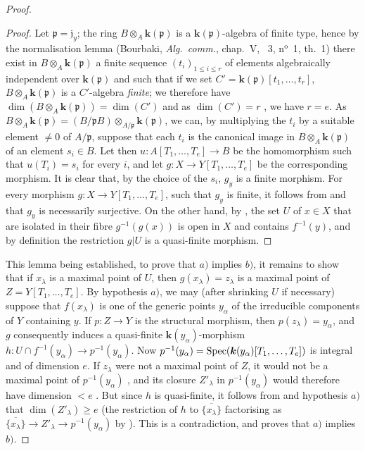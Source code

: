\begin{proof}
\begin{proof}
Let $\mathfrak{p}=\mathfrak{j}_y$; the ring $B\otimes_A \boldsymbol{k}(\mathfrak{p})$ is a $\boldsymbol{k}(\mathfrak{p})$-algebra of finite type, hence by the normalisation lemma (Bourbaki, \emph{Alg.\ comm.}, chap.~V, \textsection~3, n$^{\text{o}}$~1, th.~1) there exist in $B\otimes_A \boldsymbol{k}(\mathfrak{p})$ a finite sequence $(t_i)_{1\leq i\leq r}$ of elements algebraically independent over $\boldsymbol{k}(\mathfrak{p})$ and such that if we set $C'=\boldsymbol{k}(\mathfrak{p})[t_1,\ldots,t_r]$, $B\otimes_A \boldsymbol{k}(\mathfrak{p})$ is a $C'$-algebra \emph{finite}; we therefore have $\dim(B\otimes_A \boldsymbol{k}(\mathfrak{p}))=\dim(C')$  and as $\dim(C')=r$ , we have $r=e$.
As $B\otimes_A \boldsymbol{k}(\mathfrak{p})=(B/\mathfrak{p}B)\otimes_{A/\mathfrak{p}}\boldsymbol{k}(\mathfrak{p})$, we can, by multiplying the $t_i$ by a suitable element $\neq0$
of $A/\mathfrak{p}$, suppose that each $t_i$ is the canonical image in $B\otimes_A \boldsymbol{k}(\mathfrak{p})$ of an element $s_i\in B$.
Let then $u:A[T_1,\ldots,T_e]\to B$ be the homomorphism such that $u(T_i)=s_i$ for every $i$, and let $g:X\to Y[T_1,\ldots,T_e]$ be the corresponding morphism.
It is clear that, by the choice of the $s_i$, $g_y$ is a finite morphism.
For every morphism $g:X\to Y[T_1,\ldots,T_e]$, such that $g_y$ is finite, it follows from  and  that $g_y$ is necessarily surjective.
On the other hand, by , the set $U$ of $x\in X$ that are isolated in their fibre $g^{-1}(g(x))$ is open in $X$ and contains $f^{-1}(y)$, and by definition the restriction $g|U$ is a quasi-finite morphism.
\end{proof}

This lemma being established, to prove that $a)$ implies $b)$, it remains to show that if $x_\lambda$ is a maximal point of $U$, then $g(x_\lambda)=z_\lambda$ is a maximal point of $Z=Y[T_1,\ldots,T_e]$.
By hypothesis $a)$, we may (after shrinking $U$ if necessary) suppose that $f(x_\lambda)$ is one of the generic points $y_\alpha$ of the irreducible components of $Y$ containing $y$. If $p:Z\to Y$ is the structural morphism, then $p(z_\lambda)=y_\alpha$, and $g$ consequently induces a quasi-finite $\boldsymbol{k}(y_\alpha)$-morphism $h:U\cap f^{-1}(y_\alpha)\longrightarrow p^{-1}(y_\alpha)$.
Now $p^{-1}(y_\alpha)=\operatorname{Spec}(\boldsymbol{k}(y_\alpha)[T_1,\ldots,T_e])$ is integral and of dimension $e$. If $z_\lambda$ were not a maximal point of $Z$, it would not be a maximal point of $p^{-1}(y_\alpha)$ , and its closure $Z'_\lambda$ in $p^{-1}(y_\alpha)$ would therefore have dimension $<e$ . But since $h$ is quasi-finite, it follows from  and hypothesis $a)$ that $\dim(Z'_\lambda)\geq e$ (the restriction of $h$ to $\overline{\{x_\lambda\}}$ factorising as $\overline{\{x_\lambda\}}\longrightarrow Z'_\lambda
  \longrightarrow p^{-1}(y_\alpha)$
by ). This is a contradiction, and proves that $a)$ implies $b)$.


\end{proof}
